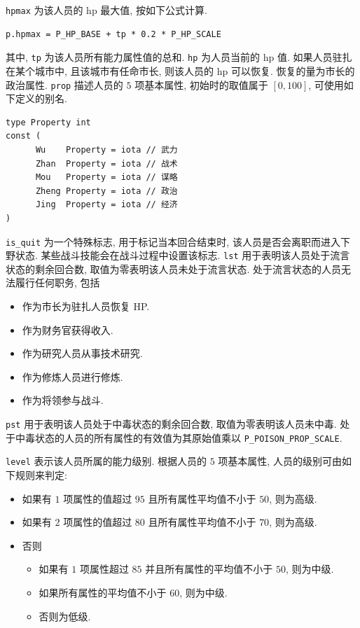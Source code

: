 \documentclass[UTF8, zihao=-4]{ctexart} %
\newcommand{\lcode}{\lstinline} % 段内插入代码
\begin{document}
\lcode{hpmax} 为该人员的 hp 最大值, 按如下公式计算.
\begin{lstlisting}
p.hpmax = P_HP_BASE + tp * 0.2 * P_HP_SCALE
\end{lstlisting}
其中, \lcode{tp} 为该人员所有能力属性值的总和. 
\lcode{hp} 为人员当前的 hp 值. 如果人员驻扎在某个城市中, 且该城市有任命市长,
则该人员的 hp 可以恢复. 恢复的量为市长的政治属性. 
\lcode{prop} 描述人员的 $5$ 项基本属性, 初始时的取值属于 $[0, 100]$, 可使用如下定义的别名.
\begin{lstlisting}
type Property int
const (
      Wu    Property = iota // 武力
      Zhan  Property = iota // 战术
      Mou   Property = iota // 谋略
      Zheng Property = iota // 政治
      Jing  Property = iota // 经济
)
\end{lstlisting}
\lcode{is_quit} 为一个特殊标志, 用于标记当本回合结束时, 该人员是否会离职而进入下野状态.
某些战斗技能会在战斗过程中设置该标志.
\lcode{lst} 用于表明该人员处于流言状态的剩余回合数, 取值为零表明该人员未处于流言状态.
处于流言状态的人员无法履行任何职务, 包括
\begin{itemize}
      \item 作为市长为驻扎人员恢复 HP.
      \item 作为财务官获得收入.
      \item 作为研究人员从事技术研究.
      \item 作为修炼人员进行修炼.
      \item 作为将领参与战斗.
\end{itemize}
\lcode{pst} 用于表明该人员处于中毒状态的剩余回合数, 取值为零表明该人员未中毒.
处于中毒状态的人员的所有属性的有效值为其原始值乘以 \lcode{P_POISON_PROP_SCALE}.

\lcode{level} 表示该人员所属的能力级别. 根据人员的 $5$ 项基本属性,
人员的级别可由如下规则来判定:
\begin{itemize}
      \item 如果有 $1$ 项属性的值超过 $95$ 且所有属性平均值不小于 $50$, 则为高级.
      \item 如果有 $2$ 项属性的值超过 $80$ 且所有属性平均值不小于 $70$, 则为高级.
      \item 否则
            \begin{itemize}
                  \item 如果有 $1$ 项属性超过 $85$ 并且所有属性的平均值不小于 $50$, 则为中级.
                  \item 如果所有属性的平均值不小于 $60$, 则为中级.
                  \item 否则为低级.
            \end{itemize}
\end{itemize}
\end{document}

